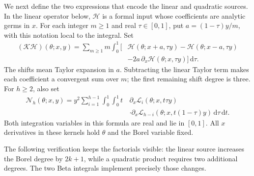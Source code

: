 \documentclass[a4paper,10pt]{article}
\numberwithin{equation}{section}
\newcommand{\dd}{\mathrm{d}}
\theoremstyle{paperplain}
\theoremstyle{paperremark}
\theoremstyle{paperplain}
\begin{document}
We next define the two expressions that encode the linear and
quadratic sources. In the linear operator below, $\mathcal H$ is a
formal input whose coefficients are analytic germs in $x$.
For each integer $m\geq1$ and real $\tau\in[0,1]$, put
$a=(1-\tau)y/m$, with this notation local to the integral. Set
\begin{equation}\label{eq:s07:linear-kernel}
 \begin{aligned}
 (\mathcal K\mathcal H)(\theta;x,y)
 =\sum_{m\geq1}m\int_0^1
 \bigl[&\mathcal H(\theta;x+a,\tau y)
             -\mathcal H(\theta;x-a,\tau y)\\
       &-2a\,\partial_x\mathcal H(\theta;x,\tau y)\bigr]\,\dd\tau.
 \end{aligned}
\end{equation}
The shifts mean Taylor expansion in $a$. Subtracting the linear
Taylor term makes each coefficient a convergent sum over $m$;
the first remaining shift degree is three. For $h\geq2$, also set
\begin{equation}\label{eq:s07:quadratic-kernel}
 \begin{aligned}
 \mathcal N_h(\theta;x,y)
 =y^2\sum_{i=1}^{h-1}\int_0^1\int_0^1
 t\,&\partial_x\mathcal L_i(\theta;x,t\tau y)\\
 &\cdot\partial_x\mathcal L_{h-i}(\theta;x,t(1-\tau)y)
                                      \,\dd\tau\,\dd t.
 \end{aligned}
\end{equation}
Both integration variables in this formula are real and lie in
$[0,1]$. All $x$ derivatives in these kernels hold $\theta$ and the
Borel variable fixed.

The following verification keeps the factorials visible: the linear
source increases the Borel degree by $2k+1$, while a quadratic
product requires two additional degrees. The two Beta integrals
implement precisely those changes.
\end{document}
